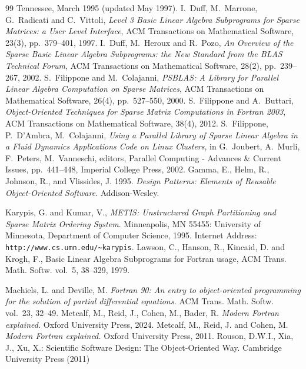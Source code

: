 \begin{thebibliography}{99}
Tennessee, March 1995 (updated May 1997).
%
I.~Duff, M.~Marrone, G.~Radicati and C.~Vittoli,
{\em Level 3 Basic Linear Algebra Subprograms for Sparse Matrices: 
a User Level Interface},
ACM Transactions on Mathematical Software, 23(3), pp.~379--401, 1997.
%
I.~Duff, M.~Heroux and R.~Pozo,
{\em An Overview of the Sparse Basic Linear
Algebra Subprograms: the New Standard from the BLAS Technical Forum},
ACM Transactions on Mathematical Software, 28(2), pp.~239--267, 2002.
S.~Filippone and M.~Colajanni, 
{\em PSBLAS: A Library for Parallel Linear Algebra
Computation on Sparse Matrices},
\newblock
ACM Transactions on Mathematical Software, 26(4), pp.~527--550, 2000.
%
S.~Filippone and A.~Buttari, 
{\em Object-Oriented Techniques for Sparse Matrix Computations in Fortran 2003},
\newblock
ACM Transactions on Mathematical Software, 38(4), 2012.
%
S.~Filippone, P.~D'Ambra, M.~Colajanni,
{\em Using a Parallel Library of Sparse Linear Algebra in a Fluid Dynamics 
Applications Code on Linux Clusters},
in G.~Joubert, A.~Murli, F.~Peters, M.~Vanneschi, editors,
Parallel Computing - Advances \& Current Issues,
pp.~441--448, Imperial College Press, 2002. 
%
{ Gamma, E.}, { Helm, R.}, { Johnson, R.}, { and} { Vlissides,
  J.} 1995.
 {\em Design Patterns: Elements of Reusable Object-Oriented Software}.
 Addison-Wesley.

%
Karypis, G. and Kumar, V.,
{\em {METIS}: Unstructured Graph Partitioning and Sparse Matrix
  Ordering System}.
Minneapolis, MN 55455: University of Minnesota, Department of
  Computer Science, 1995. 
Internet Address: {\verb|http://www.cs.umn.edu/~karypis|}.
Lawson, C.,  Hanson, R., Kincaid, D. and Krogh, F.,
   Basic {L}inear {A}lgebra {S}ubprograms for {F}ortran usage,
{ACM Trans. Math. Softw.} vol.~{5}, 38--329, 1979.

{Machiels, L. and Deville, M.}
{\em Fortran 90: An entry to object-oriented programming for the solution
  of partial differential equations.}
{ACM Trans. Math. Softw.} vol.~{23}, 32--49.
{Metcalf, M., Reid, J.,  Cohen, M., Bader, R.}
{\em Modern Fortran  explained.}
{Oxford University Press}, 2024.
%
{Metcalf, M., Reid, J. and Cohen, M.}
{\em Modern Fortran  explained.}
{Oxford University Press}, 2011.
%
%
Rouson, D.W.I., Xia, J., Xu, X.: {Scientific Software Design: The
  Object-Oriented Way}. Cambridge University Press (2011)


\end{thebibliography}
